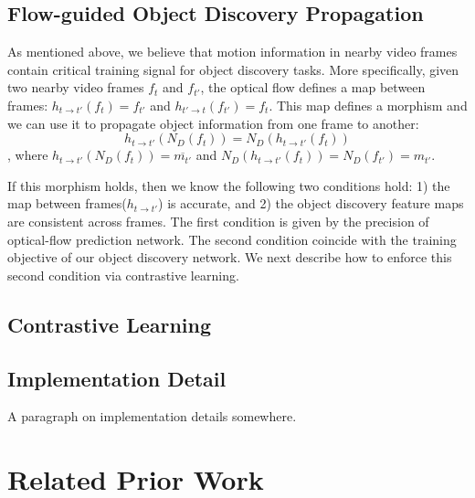 \documentclass{article}
\begin{document}
\subsection{Flow-guided Object Discovery Propagation}
As mentioned above, we believe that motion information in nearby video frames contain critical training signal for object discovery tasks. More specifically, given two nearby video frames $f_{t}$ and $f_{t'}$, the optical flow defines a map between frames: $h_{t \rightarrow t'}(f_t) = f_{t'}$ and $h_{t' \rightarrow t}(f_{t'}) = f_{t}$. This map defines a morphism and we can use it to propagate object information from one frame to another:
\[h_{t \rightarrow t'}(N_D(f_t)) = N_D(h_{t \rightarrow t'}(f_t))\],
where $h_{t \rightarrow t'}(N_D(f_t)) = \overline{m_{t'}}$ and $ N_D(h_{t \rightarrow t'}(f_t)) =  N_D(f_{t'}) = m_{t'}$.

If this morphism holds, then we know the following two conditions hold:  1) the map between frames($h_{t \rightarrow t'}$) is accurate, and 2) the object discovery feature maps are consistent across frames. The first condition is given by the precision of optical-flow prediction network. The second condition coincide with the training objective of our object discovery network. We next describe how to enforce this second condition via contrastive learning.

\subsection{Contrastive Learning}

\subsection{Implementation Detail}
A paragraph on implementation details somewhere. 

\section{Related Prior Work}
\label{sec:related_work}


\end{document}
